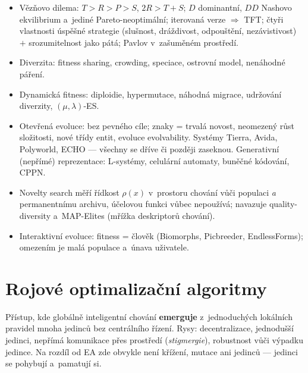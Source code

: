\documentclass[11pt,a4paper]{article}
\theoremstyle{definition}
\begin{document}
\begin{itemize}
  královny, průměrné stabilní stavy, přespecializace, zapomínání.
  Léky: archivy (hall of fame), sdílená fitness, měření proti pevné sadě.
\item Vězňovo dilema: $T>R>P>S$, $2R > T+S$; $D$ dominantní, $DD$ Nashovo
  ekvilibrium a~jediné Pareto-neoptimální; iterovaná verze $\Rightarrow$ TFT;
  čtyři vlastnosti úspěšné strategie (slušnost, dráždivost, odpouštění,
  nezávistivost) $+$ srozumitelnost jako pátá; Pavlov v~zašuměném prostředí.
\item Diverzita: fitness sharing, crowding, speciace, ostrovní model,
  nenáhodné páření.
\item Dynamická fitness: diploidie, hypermutace, náhodná migrace, udržování
  diverzity, $(\mu,\lambda)$-ES.
\item Otevřená evoluce: bez pevného cíle; znaky = trvalá novost, neomezený růst
  složitosti, nové třídy entit, evoluce evolvability. Systémy Tierra, Avida,
  Polyworld, ECHO --- všechny se dříve či později zaseknou.
  Generativní (nepřímé) reprezentace: L-systémy, celulární automaty,
  buněčné kódování, CPPN.
\item Novelty search měří řídkost $\rho(x)$ v~prostoru chování vůči populaci
  \emph{a} permanentnímu archivu, účelovou funkci vůbec nepoužívá;
  navazuje quality-diversity a~MAP-Elites (mřížka deskriptorů chování).
\item Interaktivní evoluce: fitness = člověk (Biomorphs, Picbreeder,
  EndlessForms); omezením je malá populace a~únava uživatele.
\end{itemize}

\section{Rojové optimalizační algoritmy}
\label{sec:roje}

\begin{defbox}
Přístup, kde globálně inteligentní chování \textbf{emerguje} z~jednoduchých
lokálních pravidel mnoha jedinců bez centrálního řízení. Rysy: decentralizace,
jednodušší jedinci, nepřímá komunikace přes prostředí (\emph{stigmergie}),
robustnost vůči výpadku jedince. Na rozdíl od EA zde obvykle není křížení,
mutace ani  jedinců --- jedinci se pohybují a~pamatují si.
\end{defbox}
\end{document}
